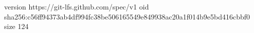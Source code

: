 version https://git-lfs.github.com/spec/v1
oid sha256:c56ff94373ab4df994fc38be506165549e849938ac20a1f014b9e5bd416cbbf0
size 124
